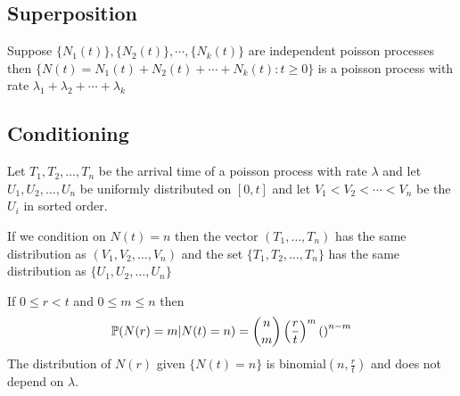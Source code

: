 \documentclass[12pt,a4paper]{article}
\begin{document}
\subsection{Superposition}
\begin{thm}[•]
Suppose $\{N_1(t)\},\{N_2(t)\}, \cdots, \{N_k(t)\}$ are independent poisson processes then $\{N(t) = N_1(t) + N_2(t) + \cdots + N_k(t) : t\geq 0\}$ is a poisson process with rate $\lambda_1 + \lambda_2 + \cdots + \lambda_k$ 
\end{thm}
\newpage
\subsection{Conditioning}
Let $T_1, T_2, \ldots, T_n$ be the arrival time of a poisson process with rate $\lambda$ and let $U_1, U_2, \ldots, U_n$ be uniformly distributed on $[0,t]$ and let $V_1 < V_2 < \cdots < V_n$ be the $U_i$ in sorted order. 

\begin{thm}
If we condition on $N(t) = n$ then the vector $(T_1, \ldots, T_n)$ has the same distribution as $(V_1, V_2, \ldots, V_n)$ and the set $\{T_1, T_2, \ldots, T_n\}$ has the same distribution as $\{U_1, U_2, \ldots, U_n\}$
\end{thm}
\begin{thm}
If $0\leq r < t$ and $0\leq m \leq n$ then 
\begin{align*}
\P(N(r) = m | N(t) = n) = {n\choose m}\left(\frac{r}{t}\right)^m\left(\right)^{n-m}
\end{align*}
The distribution of $N(r)$ given $\{N(t) = n\}$ is  binomial$(n, \frac{r}{t})$ and does not depend on $\lambda$. 
\end{thm}
\end{document}
